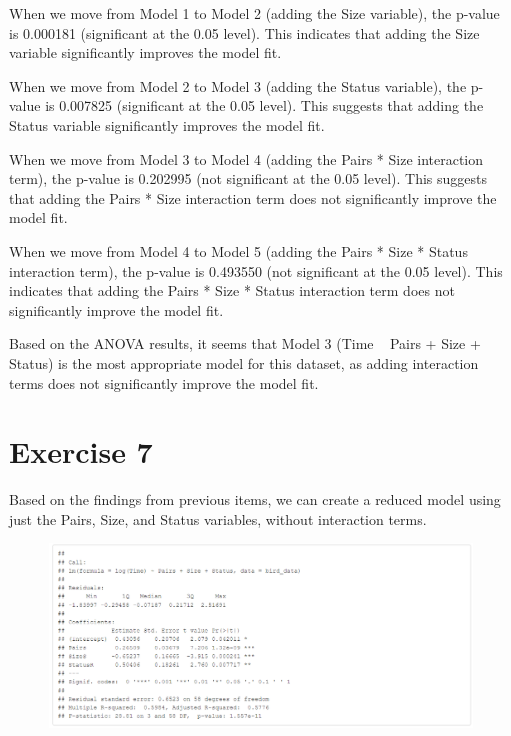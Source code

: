\documentclass{article}
\begin{document}
When we move from Model 1 to Model 2 (adding the Size variable), the p-value is 0.000181 (significant at the 0.05 level). This indicates that adding the Size variable significantly improves the model fit.

When we move from Model 2 to Model 3 (adding the Status variable), the p-value is 0.007825 (significant at the 0.05 level). This suggests that adding the Status variable significantly improves the model fit.

When we move from Model 3 to Model 4 (adding the Pairs * Size interaction term), the p-value is 0.202995 (not significant at the 0.05 level). This suggests that adding the Pairs * Size interaction term does not significantly improve the model fit.

When we move from Model 4 to Model 5 (adding the Pairs * Size * Status interaction term), the p-value is 0.493550 (not significant at the 0.05 level). This indicates that adding the Pairs * Size * Status interaction term does not significantly improve the model fit.

Based on the ANOVA results, it seems that Model 3 (Time ~ Pairs + Size + Status) is the most appropriate model for this dataset, as adding interaction terms does not significantly improve the model fit.

\section{Exercise 7}
Based on the findings from previous items, we can create a reduced model using just the Pairs, Size, and Status variables, without interaction terms.

\begin{figure}
    \includegraphics[width=\linewidth]{tables/all-added.png}
\end{figure}
\end{document}
